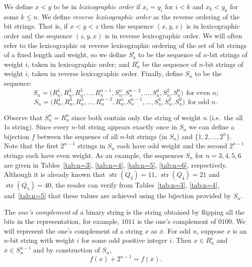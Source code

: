 \documentclass[12pt]{article}
\DeclareMathOperator{\str}{str}
\begin{document}
We define $x < y$ to be in {\it lexicographic order} if $x_i=y_i$ for $i<k$ and $x_k < y_k$ for some $k \leq n$.  We define \emph{reverse lexicographic order} as the reverse ordering of the bit strings.  That is, if $x<y<z$ then the sequence $(x,y,z)$ is in lexicographic order and the sequence $(z,y,x)$ is in reverse lexicographic order.  We will often refer to the lexicographic or reverse lexicographic ordering of the set of bit strings of a fixed length and weight, so we define $S_n^i$ to be the sequence of $n$-bit strings of weight $i$, taken in lexicographic order; and $R_n^i$ be the sequence of $n$-bit strings of weight $i$, taken in reverse lexicographic order. Finally, define $S_n$ to be the sequence: 
$$S_n = \big(R_n^1,R_n^3,R_n^5,\dots,R_n^{n-1},S_n^n,S_n^{n-2},\dots,S_n^4,S_n^2,S_n^0\big) ~~\text{for even $n$;}$$ $$S_n = \big(R_n^1,R_n^3,R_n^5,\dots,R_n^{n-2},R_n^n,S_n^{n-1},\dots,S_n^4,S_n^2,S_n^0\big) ~~\text{for odd $n$.}$$

Observe that $S_n^n = R_n^n$ since both contain only the string of weight $n$ (i.e.\ the all $1$s string).  Since every $n$-bit string appears exactly once in $S_n$ we can define a bijection $f$ between the sequence of all $n$-bit strings (in $S_n$) and $\{1,2,\dots,2^n\}$. Note that the first $2^{n-1}$ strings in $S_n$ each have odd weight and the second $2^{n-1}$ strings each have even weight. As an example, the sequences $S_n$ for $n = 3,4,5,6$ are given in Tables~\ref{tab:n=3}, \ref{tab:n=4}, \ref{tab:n=5}, \ref{tab:n=6}, respectively. Although it is already known that $\str(Q_3)=11$, $\str(Q_4)=21$ and $\str(Q_5) = 40$, the reader can verify from Tables~\ref{tab:n=3}, \ref{tab:n=4}, and~\ref{tab:n=5} that these values are achieved using the bijection provided by $S_n$.

\medskip

The \emph{one's complement} of a binary string is the string obtained by flipping all the bits in the representation, for example, $1011$ is the one's complement of $0100$.  We will represent the one's complement of a string $x$ as $\overline{x}$.  For odd $n$, suppose $x$ is an $n$-bit string with weight $i$ for some odd positive integer $i$.  Then $x \in R_n^i$ and $\overline{x} \in S_n^{n-i}$ and by construction of $S_n$, \begin{equation}\label{eqn:oddn}f(x) + 2^{n-1} = f(\overline{x}).\end{equation}
\end{document}
